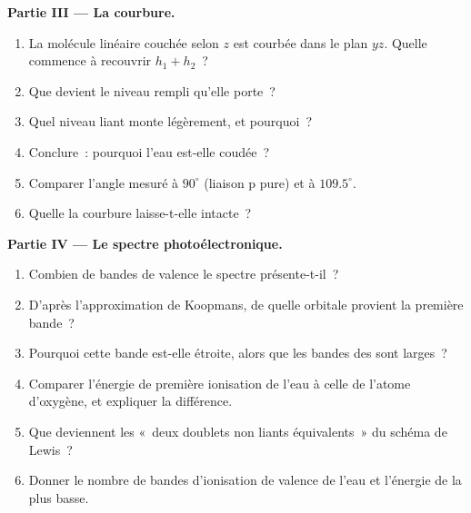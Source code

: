 \begin{problem}
\medskip
\noindent\textbf{Partie III --- La courbure.}
\begin{enumerate}[resume]
  \item La molécule linéaire couchée selon $z$ est courbée dans le plan $yz$. Quelle
         commence à recouvrir $h_1 + h_2$~?
  \item Que devient le niveau rempli qu'elle porte~?
  \item Quel niveau liant monte légèrement, et pourquoi~?
  \item Conclure~: pourquoi l'eau est-elle coudée~?
  \item Comparer l'angle mesuré à $90^\circ$ (liaison p pure) et à $109.5^\circ$.
  \item Quelle  la courbure laisse-t-elle intacte~?
\end{enumerate}

\medskip
\noindent\textbf{Partie IV --- Le spectre photoélectronique.}
\begin{enumerate}[resume]
  \item Combien de bandes de valence le spectre présente-t-il~?
  \item D'après l'approximation de Koopmans, de quelle orbitale provient la première bande~?
  \item Pourquoi cette bande est-elle étroite, alors que les bandes des  sont larges~?
  \item Comparer l'énergie de première ionisation de l'eau à celle de l'atome
        d'oxygène, et expliquer la différence.
  \item Que deviennent les «~deux doublets non liants équivalents~» du schéma de Lewis~?
  \item Donner le nombre de bandes d'ionisation de valence de l'eau et l'énergie de
        la plus basse.
\end{enumerate}
\end{problem}
